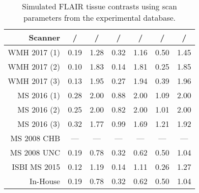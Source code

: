 \begin{table}[h]
  \centering
  \caption{Simulated FLAIR tissue contrasts using scan parameters from the experimental database.}
  \label{tab:simflair}
  \begin{tabular}{rcccccc}
  	\hline
  	Scanner      & \gm/\wm & \gm/\csf & \gm/\wmh & \wm/\csf & \wm/\wmh & \csf/\wmh \\ \hline
  	WMH 2017 (1) & 0.19    & 1.28     & 0.32     & 1.16     & 0.50     & 1.45      \\
  	WMH 2017 (2) & 0.10    & 1.83     & 0.14     & 1.81     & 0.25     & 1.85      \\
  	WMH 2017 (3) & 0.13    & 1.95     & 0.27     & 1.94     & 0.39     & 1.96      \\
  	MS  2016 (1) & 0.28    & 2.00     & 0.88     & 2.00     & 1.09     & 2.00      \\
  	MS  2016 (2) & 0.25    & 2.00     & 0.82     & 2.00     & 1.01     & 2.00      \\
  	MS  2016 (3) & 0.32    & 1.77     & 0.99     & 1.69     & 1.21     & 1.92      \\
  	MS  2008 CHB & ---     & ---      & ---      & ---      & ---      & ---       \\
  	MS  2008 UNC & 0.19    & 0.78     & 0.32     & 0.62     & 0.50     & 1.04      \\
  	ISBI MS 2015 & 0.12    & 1.19     & 0.14     & 1.11     & 0.26     & 1.27      \\
  	In-House     & 0.19    & 0.78     & 0.32     & 0.62     & 0.50     & 1.04      \\ \hline
  \end{tabular}
\end{table}
